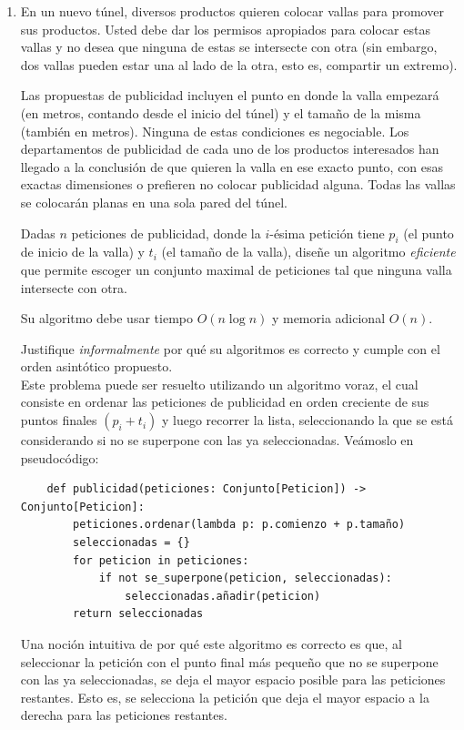 \documentclass[letterpaper, 12pt]{article}
\begin{document}
\begin{enumerate}


\item  En un nuevo túnel, diversos productos quieren colocar vallas para promover sus productos. Usted debe dar los permisos apropiados para colocar estas vallas y no desea que ninguna de estas se intersecte con otra (sin embargo, dos vallas pueden estar una al lado de la otra, esto es, compartir un extremo).

Las propuestas de publicidad incluyen el punto en donde la valla empezará (en metros, contando desde el inicio del túnel) y el tamaño de la misma (también en metros). Ninguna de estas condiciones es negociable. Los departamentos de publicidad de cada uno de los productos interesados han llegado a la conclusión de que quieren la valla en ese exacto punto, con esas exactas dimensiones o prefieren no colocar publicidad alguna. Todas las vallas se colocarán planas en una sola pared del túnel.

Dadas $n$ peticiones de publicidad, donde la $i$-ésima petición tiene $p_i$ (el punto de inicio de la valla) y $t_i$ (el tamaño de la valla), diseñe un algoritmo \emph{eficiente} que permite escoger un conjunto maximal de peticiones tal que ninguna valla intersecte con otra.

Su algoritmo debe usar tiempo $O(n\log n)$ y memoria adicional $O(n)$.

Justifique \emph{informalmente} por qué su algoritmos es correcto y cumple con el orden asintótico propuesto. \\

Este problema puede ser resuelto utilizando un algoritmo voraz, el cual consiste en ordenar las peticiones de publicidad en orden creciente de sus puntos finales $(p_i + t_i)$ y luego recorrer la lista, seleccionando la que se está considerando si no se superpone con las ya seleccionadas. Veámoslo en pseudocódigo:

\begin{verbatim}
    def publicidad(peticiones: Conjunto[Peticion]) -> Conjunto[Peticion]:
        peticiones.ordenar(lambda p: p.comienzo + p.tamaño)
        seleccionadas = {}
        for peticion in peticiones:
            if not se_superpone(peticion, seleccionadas):
                seleccionadas.añadir(peticion)
        return seleccionadas
\end{verbatim}

Una noción intuitiva de por qué este algoritmo es correcto es que, al seleccionar la petición con el punto final más pequeño que no se superpone con las ya seleccionadas, se deja el mayor espacio posible para las peticiones restantes. Esto es, se selecciona la petición que deja el mayor espacio a la derecha para las peticiones restantes.


\end{enumerate}
\end{document}
